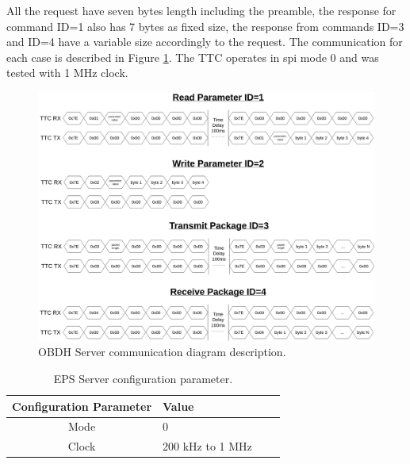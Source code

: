 All the request have seven bytes length including the preamble, the response for command ID=1 also has 7 bytes as fixed size, the response from commands ID=3 and ID=4 have a variable size accordingly to the request. The communication for each case is described in Figure \ref{fig:obdh-server-communication}. The TTC operates in spi mode 0 and was tested with 1 MHz clock.

\begin{figure}[!ht]
    \begin{center}
        \includegraphics[width=1\textwidth]{figures/obdh_communication.drawio.png}
        \caption{OBDH Server communication diagram description.}
        \label{fig:obdh-server-communication}
    \end{center}
\end{figure}

\begin{table}[!ht]
    \centering
    \begin{tabular}{clll}
        \toprule[1.5pt]
        \textbf{Configuration Parameter} & \textbf{Value}\\
        \midrule
        Mode                & 0                 \\
        Clock               & 200 kHz to 1 MHz  \\
        \bottomrule[1.5pt]
    \end{tabular}
    \caption{EPS Server configuration parameter.}
    \label{tab:eps_config}
\end{table}
